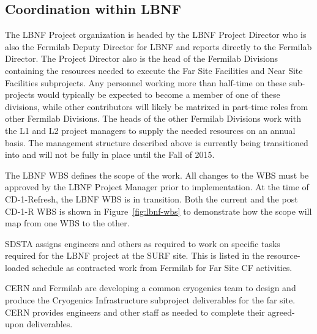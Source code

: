 \subsection{Coordination within LBNF}

The LBNF Project organization is headed by the LBNF Project Director who is also the Fermilab Deputy Director for LBNF and reports directly to the Fermilab Director. The Project Director also is the head of the Fermilab Divisions containing the resources needed to execute the Far Site Facilities and Near Site Facilities subprojects.  Any personnel working more than half-time on these sub-projects would typically be expected to become a member of one of these divisions, while other contributors will likely be matrixed in part-time roles from other Fermilab Divisions.  The heads of the other Fermilab Divisions work with the L1 and L2 project managers to supply the needed resources on an annual basis.  The management structure described above is currently being transitioned into and will not be fully in place until the Fall of 2015.  

The LBNF WBS defines the scope of the work. All changes to the WBS must be approved by the LBNF Project Manager prior to implementation. At the time of CD-1-Refresh, the LBNF WBS is in transition. Both the current and the post CD-1-R WBS is shown in Figure~\ref{fig:lbnf-wbs} to demonstrate how the scope will map from one WBS to the other. 

SDSTA assigns engineers and others as required to work on specific tasks required for the LBNF project at the SURF site. This is listed in the resource-loaded schedule as contracted work from Fermilab for Far Site CF activities. 

CERN and Fermilab are developing a common cryogenics team to design and produce the Cryogenics Infrastructure subproject deliverables for the far site. CERN provides engineers and other staff as needed to complete their agreed-upon deliverables.  


